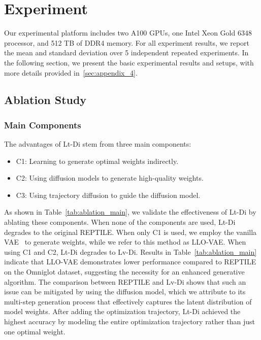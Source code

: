 \section{Experiment}\label{sec:experiment}
Our experimental platform includes two A100 GPUs, one Intel Xeon Gold 6348 processor, and 512 TB of DDR4 memory. For all experiment results, we report the mean and standard deviation over 5 independent repeated experiments. In the following section, we present the basic experimental results and setups, with more details provided in~\ref{sec:appendix_4}.

\subsection{Ablation Study}\label{sec:ablation}
\subsubsection{Main Components}
The advantages of Lt-Di stem from three main components: 
\begin{itemize}[align=left]
    \item C1: Learning to generate optimal weights indirectly.
    \item C2: Using diffusion models to generate high-quality weights.
    \item C3: Using trajectory diffusion to guide the diffusion model.
\end{itemize}

As shown in Table~\ref{tab:ablation_main}, we validate the effectiveness of Lt-Di by ablating these components. When none of the components are used, Lt-Di degrades to the original REPTILE. When only C1 is used, we employ the vanilla VAE~\cite{VAE} to generate weights, while we refer to this method as LLO-VAE. When using C1 and C2, Lt-Di degrades to Lv-Di. Results in Table~\ref{tab:ablation_main} indicate that LLO-VAE demonstrates lower performance compared to REPTILE on the Omniglot dataset, suggesting the necessity for an enhanced generative algorithm. The comparison between REPTILE and Lv-Di shows that such an issue can be mitigated by using the diffusion model, which we attribute to its multi-step generation process that effectively captures the latent distribution of model weights. After adding the optimization trajectory, Lt-Di achieved the highest accuracy by modeling the entire optimization trajectory rather than just one optimal weight.

